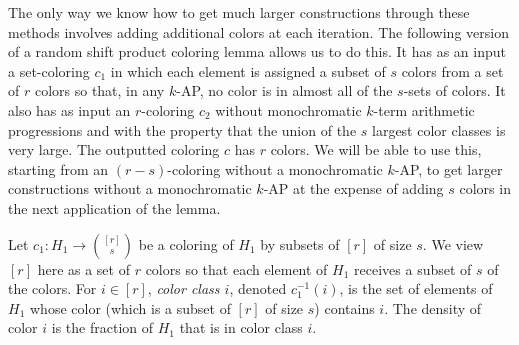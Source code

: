 \documentclass[11pt]{article}
\numberwithin{equation}{section}
\theoremstyle{definition}
\theoremstyle{remark}
\begin{document}
The only way we know how to get much larger constructions through these methods involves adding additional colors at each iteration. The following version of a random shift product coloring lemma allows us to do this. It has as an input a set-coloring $c_1$ in which each element is assigned a subset of $s$ colors from a set of $r$ colors so that, in any $k$-AP, no color is in almost all of the $s$-sets of colors. It also has as input an $r$-coloring $c_2$ without monochromatic $k$-term arithmetic progressions and with the property that the union of the $s$ largest color classes is very large. The outputted coloring $c$ has $r$ colors. We will be able to use this, starting from an $(r-s)$-coloring without a monochromatic $k$-AP, to get larger constructions without a monochromatic $k$-AP at the expense of adding $s$ colors in the next application of the lemma.

Let $c_1:H_1 \rightarrow {[r] \choose s}$ be a coloring of $H_1$ by subsets of $[r]$ of size $s$. We view $[r]$ here as a set of $r$ colors so that each element of $H_1$ receives a subset of $s$ of the colors. For $i \in [r]$, {\it color class $i$}, denoted $c_1^{-1}(i)$, is the set of elements of $H_1$ whose color (which is a subset of $[r]$ of size $s$) contains $i$. The density of color $i$ is the fraction of $H_1$ that is in color class $i$. 
\end{document}
